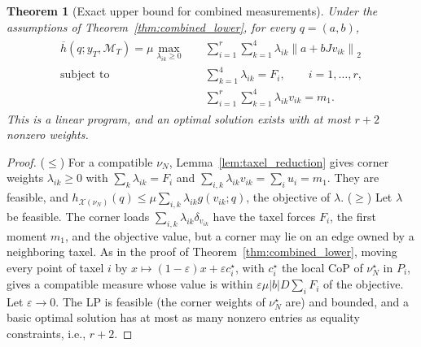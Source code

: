 \documentclass[11pt,a4paper]{article}
\theoremstyle{plain}
\newtheorem{theorem}{Theorem}[section]
\newcommand{\X}{\mathcal X}
\begin{document}
\begin{theorem}[Exact upper bound for combined measurements]
\label{thm:combined_upper}
    Under the assumptions of Theorem~\ref{thm:combined_lower}, for every $q=(a,b)$,
    \begin{align}
        \label{eq:combined_upper_reduction}
        \boxed{
        \begin{aligned}
        \overline h(q;y_T,\mathcal M_T)
        =
        \mu\max_{\lambda_{ik}\geq0}\quad&
        \sum_{i=1}^r\sum_{k=1}^{4}
        \lambda_{ik}
        \left\|a+bJv_{ik}\right\|_2\\
        \text{subject to}\quad&
        \sum_{k=1}^{4}\lambda_{ik}=F_i,
        \qquad i=1,\ldots,r,\\
        &
        \sum_{i=1}^r\sum_{k=1}^{4}
        \lambda_{ik}v_{ik}=m_1.
        \end{aligned}}
    \end{align}
    This is a linear program, and an optimal solution exists with at most $r+2$ nonzero weights.
\end{theorem}
\begin{proof}
    ($\le$) For a compatible $\nu_N$, Lemma~\ref{lem:taxel_reduction} gives corner weights $\lambda_{ik}\ge0$ with $\sum_k\lambda_{ik}=F_i$
    and $\sum_{i,k}\lambda_{ik}v_{ik}=\sum_iu_i=m_1$. They are feasible, and $h_{\X(\nu_N)}(q)\le\mu\sum_{i,k}\lambda_{ik}g(v_{ik};q)$, the objective of $\lambda$.
    ($\ge$) Let $\lambda$ be feasible. The corner loads $\sum_{i,k}\lambda_{ik}\delta_{v_{ik}}$ have the taxel forces $F_i$, the first moment $m_1$, and the objective value, but a corner may lie on an edge
    owned by a neighboring taxel. As in the proof of Theorem~\ref{thm:combined_lower}, moving every point of taxel $i$ by $x\mapsto(1-\varepsilon)x+\varepsilon c_i^\star$, with $c_i^\star$ the local CoP of $\nu_N^\star$
    in $P_i$, gives a compatible measure whose value is within $\varepsilon\mu|b|D\sum_iF_i$ of the objective. Let $\varepsilon\to0$.
    The LP is feasible (the corner weights of $\nu_N^\star$ are) and bounded, and a basic optimal solution has at most as many nonzero entries as equality constraints, i.e., $r+2$.
\end{proof}
\end{document}
